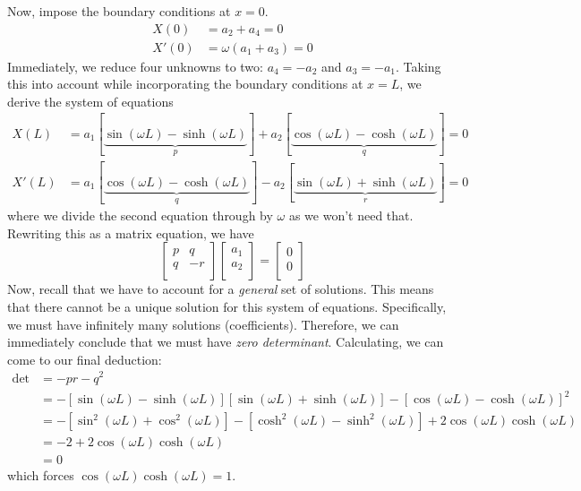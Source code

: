 \documentclass[a4paper]{article}
\begin{document}
Now, impose the boundary conditions at \( x = 0 \).
\begin{align*}
	X \!\left( 0 \right) & = a_{2} + a_{4} = 0 \\
	X'\!\left( 0 \right) & = \omega \!\left( a_{1} + a_{3} \right) = 0
\end{align*}
Immediately, we reduce four unknowns to two: \( a_{4} = -a_{2} \) and \( a_{3} = -a_{1} \). Taking this into account while incorporating the boundary conditions at \( x = L \), we derive the system of equations
\begin{align*}
	X \!\left( L \right) & = a_{1}\!\left[ \underbrace{\sin\!\left(\omega L\right) - \sinh\!\left(\omega L\right)}_{p} \right] + a_{2}\!\left[ \underbrace{\cos\!\left(\omega L\right) - \cosh\!\left(\omega L\right)}_{q} \right] = 0 \\
	X'\!\left( L \right) & = a_{1}\!\left[ \underbrace{\cos\!\left(\omega L\right) - \cosh\!\left(\omega L\right)}_{q} \right] - a_{2}\!\left[ \underbrace{\sin\!\left(\omega L\right) + \sinh\!\left(\omega L\right)}_{r} \right] = 0
\end{align*}
where we divide the second equation through by \( \omega \) as we won't need that. Rewriting this as a matrix equation, we have
\[
	\begin{bmatrix}
		p & q \\
		q & -r \\
	\end{bmatrix}
	\begin{bmatrix}
		a_{1} \\
		a_{2} \\
	\end{bmatrix} = 
	\begin{bmatrix}
		0 \\
		0 \\
	\end{bmatrix}
\]
Now, recall that we have to account for a \textit{general} set of solutions. This means that there cannot be a unique solution for this system of equations. Specifically, we must have infinitely many solutions (coefficients). Therefore, we can immediately conclude that we must have \textit{zero determinant}. Calculating, we can come to our final deduction:
\begin{align*}
	\det & = -pr - q^{2} \\
	 & = -\!\left[ \sin\!\left(\omega L\right) - \sinh\!\left(\omega L\right) \right]\!\left[ \sin\!\left(\omega L\right) + \sinh\!\left(\omega L\right) \right] - \!\left[ \cos\!\left(\omega L\right) - \cosh\!\left(\omega L\right) \right]^{2} \\ 
	 & = -\!\left[ \sin^{2}\!\left(\omega L\right) + \cos^{2}\!\left(\omega L\right) \right] - \!\left[ \cosh^{2}\!\left(\omega L\right) - \sinh^{2}\!\left(\omega L\right) \right] + 2 \cos\!\left(\omega L\right) \cosh\!\left(\omega L\right) \\
	 & = -2 + 2 \cos\!\left(\omega L\right) \cosh\!\left(\omega L\right) \\
	 & = 0
\end{align*}
which forces \( \cos\!\left(\omega L\right) \cosh\!\left(\omega L\right) = 1 \).
\end{document}
